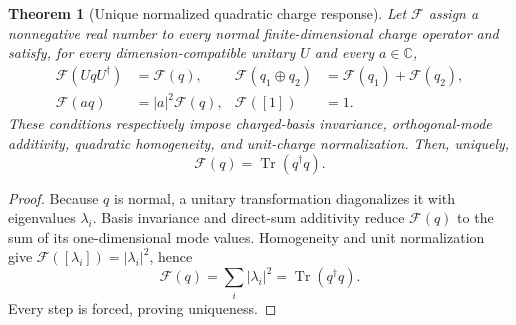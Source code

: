 \documentclass[11pt]{article}
\newtheorem{theorem}{Theorem}[section]
\begin{document}
\begin{theorem}[Unique normalized quadratic charge response]
\label{thm:priii-unique-quadratic-response}
Let \(\mathcal F\) assign a nonnegative real number to every normal
finite-dimensional charge operator and satisfy, for every dimension-compatible
unitary \(U\) and every \(a\in\mathbb C\),
\begin{align}
\mathcal F(UqU^\dagger)&=\mathcal F(q),
&\mathcal F(q_1\oplus q_2)&=\mathcal F(q_1)+\mathcal F(q_2),\nonumber\\
\mathcal F(aq)&=|a|^2\mathcal F(q),
&\mathcal F([1])&=1.
\label{eq:priii-canonical-response-conditions}
\end{align}
These conditions respectively impose charged-basis invariance,
orthogonal-mode additivity, quadratic homogeneity, and unit-charge
normalization.  Then, uniquely,
\begin{equation}
\mathcal F(q)=\operatorname{Tr}(q^\dagger q).
\label{eq:priii-unique-response-functional}
\end{equation}
\end{theorem}

\begin{proof}
Because \(q\) is normal, a unitary transformation diagonalizes it with
eigenvalues \(\lambda_i\).  Basis invariance and direct-sum additivity reduce
\(\mathcal F(q)\) to the sum of its one-dimensional mode values.  Homogeneity
and unit normalization give
\(\mathcal F([\lambda_i])=|\lambda_i|^2\), hence
\begin{equation}
\mathcal F(q)=\sum_i|\lambda_i|^2
=\operatorname{Tr}(q^\dagger q).
\end{equation}
Every step is forced, proving uniqueness.
\end{proof}
\end{document}
